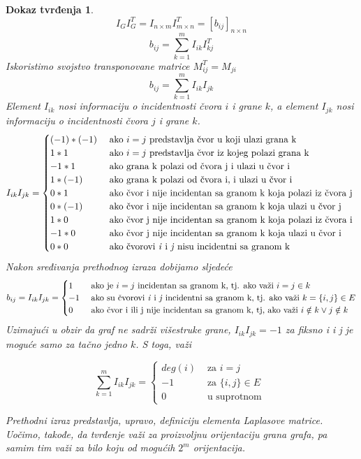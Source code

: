 \documentclass[11pt]{article}
\newtheorem*{custom_proof}{Dokaz tvrđenja}
\begin{document}
			\begin{custom_proof}
			\[
				I_G I_G^T = I_{n \times m}  I^T_{m \times n}  = [b_{ij}]_{n \times n}
			\]
			\[
				 b_{ij} = \sum_{k=1}^{m} I_{ik} I_{kj}^T
			\]
			Iskoristimo svojstvo transponovane matrice $M_{ij}^T = M_{ji}$
			\[
				 b_{ij} = \sum_{k=1}^{m} I_{ik} I_{jk}
			\]
			Element $I_{ik}$ nosi informaciju o incidentnosti čvora $i$ i grane $k$, a element $I_{jk}$ nosi informaciju o incidentnosti čvora $j$ i grane $k$.
			\[
				 I_{ik}I_{jk} =
				 \begin{cases}
				 (-1) * (-1) & \text{ ako } i = j \text{ predstavlja čvor u koji ulazi grana k } \\
				 1 * 1 & \text{ ako } i = j \text{ predstavlja čvor iz kojeg polazi grana k } \\
				 -1 * 1 & \text{ ako grana k polazi od čvora j i ulazi u čvor i} \\
				 1 * (-1) & \text{ ako grana k polazi od čvora i, i ulazi u čvor i} \\
				 0 * 1 & \text{ ako čvor i nije incidentan sa granom k koja polazi iz čvora j } \\ 
				 0 * (-1) & \text{ ako čvor i nije incidentan sa granom k koja ulazi u čvor j } \\ 
				 1 * 0 & \text{ ako čvor j nije incidentan sa granom k koja polazi iz čvora i } \\ 
				 -1 * 0 & \text{ ako čvor j nije incidentan sa granom k koja ulazi u čvor i } \\ 
				 0 * 0 & \text{ ako čvorovi \emph{i} i \emph{j} nisu incidentni sa granom k } \\ 
				 \end{cases}
			\]
			Nakon sređivanja prethodnog izraza dobijamo sljedeće
			\[
				 b_{ij} = I_{ik}I_{jk} =
				 \begin{cases}
				 1 & \text{ ako je } i = j \text{ incidentan sa granom k, tj. ako važi }  i = j \in k \\
				 -1 & \text{ ako su čvorovi \emph{i} i \emph{j} incidentni sa granom k, tj. ako važi } k = \{i,j\} \in E \\
				 0 & \text{ ako čvor i ili j nije incidentan sa granom k, tj, ako važi } i \notin k \lor j \notin k 
				 \end{cases}
			\]
			Uzimajući u obzir da graf ne sadrži višestruke grane, $I_{ik}I_{jk} = -1$ za fiksno \emph{i} i \emph{j} je moguće samo za tačno jedno $k$. S toga, važi
			
			\[
				\sum_{k=1}^{m} I_{ik}I_{jk} =
				 \begin{cases}
				deg(i)  & \text{ za } i = j \\
				 -1  & \text{ za } \{i,j\} \in E \\
				 0 & \text{ u suprotnom }
				 \end{cases}
			 \]

			Prethodni izraz predstavlja, upravo, definiciju elementa Laplasove matrice. Uočimo, takođe, da tvrđenje važi za proizvoljnu orijentaciju grana grafa, pa samim tim važi za bilo koju
		    od mogućih $2^m$ orijentacija.
			\end{custom_proof}
	
\end{document}
